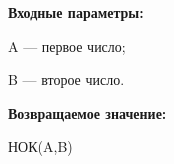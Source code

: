 \textbf{Входные параметры:}  
 
A --- первое число;
 
B --- второе число.

\textbf{Возвращаемое значение:}
 
 НОК(A,B)